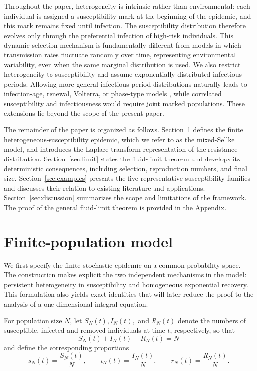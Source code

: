 \documentclass[pdflatex,sn-mathphys-ay]{sn-jnl}
\theoremstyle{thmstyleone}
\theoremstyle{thmstyletwo}
\theoremstyle{thmstylethree}
\begin{document}
Throughout the paper, heterogeneity is intrinsic rather than environmental:
each individual is assigned a susceptibility mark at the beginning of the
epidemic, and this mark remains fixed until infection. The susceptibility
distribution therefore evolves only through the preferential infection of
high-risk individuals. This dynamic-selection mechanism is fundamentally
different from models in which transmission rates fluctuate randomly over
time, representing environmental variability, even when the same marginal
distribution is used. %
We also restrict
heterogeneity to susceptibility and assume exponentially distributed
infectious periods. Allowing more general infectious-period distributions
naturally leads to infection-age, renewal, Volterra, or phase-type models
\citep{FengThieme2000,ForienPangPardoux2021}, while correlated susceptibility
and infectiousness would require joint marked populations. These extensions
lie beyond the scope of the present paper.

The remainder of the paper is organized as follows.
Section~\ref{sec:model} defines the finite heterogeneous-susceptibility epidemic, which we refer to as the mixed-Sellke model, and introduces the Laplace-transform representation of the resistance distribution.
Section~\ref{sec:limit} states the fluid-limit theorem and develops its
deterministic consequences, including selection, reproduction numbers, and
final size. Section~\ref{sec:examples} presents the five representative
susceptibility families and discusses their relation to existing literature
and applications. 
 Section~\ref{sec:discussion} summarizes the scope and limitations of
the framework.  The proof of the
general fluid-limit theorem is provided in the Appendix.

\section{Finite-population model}\label{sec:model}

We first specify the finite stochastic epidemic on a common probability
space. The construction makes explicit the two independent mechanisms in the
model: persistent heterogeneity in susceptibility and homogeneous exponential
recovery. This formulation also yields exact identities that will later reduce
the proof to the analysis of a one-dimensional  integral equation. 

For population size \(N\), let { $S_N(t), I_N(t),$ and $R_N(t)$ denote the numbers of susceptible, infected and removed individuals at time $t$, respectively, so that }
\[
S_N(t)+I_N(t)+R_N(t)=N
\]
and define the corresponding proportions
\[
s_N(t)=\frac{S_N(t)}{N},\qquad
\iota_N(t)=\frac{I_N(t)}{N},\qquad
r_N(t)=\frac{R_N(t)}{N}.
\]
\end{document}
